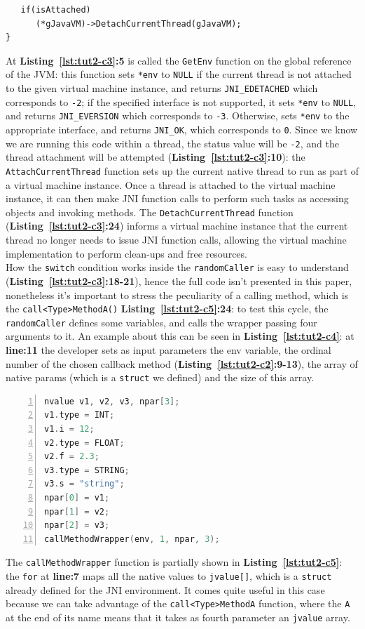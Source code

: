 \documentclass[a4paper,10pt]{article}
\newcommand{\keyword}[1]{\texttt{#1}}
\newcommand{\refl}[1]{\textbf{Listing~\ref{#1}}}
\begin{document}
\begin{multicols}{2}
\begin{lstlisting}
   if(isAttached)
      (*gJavaVM)->DetachCurrentThread(gJavaVM);
}
\end{lstlisting}
At \refl{lst:tut2-c3}\textbf{:5} is called the \keyword{GetEnv} function on the global reference of the JVM: this function sets \keyword{*env} to \keyword{NULL} if the current thread is not attached to the given virtual machine instance, and returns \keyword{JNI\_EDETACHED} which corresponds to \keyword{-2}; if the specified interface is not supported, it sets \keyword{*env} to \keyword{NULL}, and returns \keyword{JNI\_EVERSION} which corresponds to \keyword{-3}. Otherwise, sets \keyword{*env} to the appropriate interface, and returns \keyword{JNI\_OK}, which corresponds to \keyword{0}. Since we know we are running this code within a thread, the status value will be \keyword{-2}, and the thread attachment will be attempted (\refl{lst:tut2-c3}\textbf{:10}): the \keyword{AttachCurrentThread} function sets up the current native thread to run as part of a virtual machine instance. Once a thread is attached to the virtual machine instance, it can then make JNI function calls to perform such tasks as accessing objects and invoking methods. The \keyword{DetachCurrentThread} function (\refl{lst:tut2-c3}\textbf{:24}) informs a virtual machine instance that the current thread no longer needs to issue JNI function calls, allowing the virtual machine implementation to perform clean-ups and free resources.\\
How the \keyword{switch} condition works inside the \keyword{randomCaller} is easy to understand (\refl{lst:tut2-c3}\textbf{:18-21}), hence the full code isn't presented in this paper, nonetheless it's important to stress the peculiarity of a calling method, which is the \keyword{call<Type>MethodA()} \refl{lst:tut2-c5}\textbf{:24}: to test this cycle, the \keyword{randomCaller} defines some variables, and calls the wrapper passing four arguments to it. An example about this can be seen in \refl{lst:tut2-c4}: at \textbf{line:11} the developer sets as input parameters the env variable, the ordinal number of the chosen callback method (\refl{lst:tut2-c2}\textbf{:9-13}), the array of native params (which is a \keyword{struct} we defined) and the size of this array.
\begin{lstlisting}[language=C,
				   columns=fullflexible,
				   showstringspaces=false,
				   xleftmargin=15pt,
				   frame = l,
				   numbers=left,
				   commentstyle=\color{gray}\upshape,
				   caption=Part of tutorial2.c - method calls in randomCaller(),
				   label=lst:tut2-c4]
nvalue v1, v2, v3, npar[3];
v1.type = INT;
v1.i = 12;
v2.type = FLOAT;
v2.f = 2.3;
v3.type = STRING;
v3.s = "string";
npar[0] = v1;
npar[1] = v2;
npar[2] = v3;
callMethodWrapper(env, 1, npar, 3);
\end{lstlisting}
The \keyword{callMethodWrapper} function is partially shown in \refl{lst:tut2-c5}: the \keyword{for} at \textbf{line:7} maps all the native values to \keyword{jvalue[]}, which is a \keyword{struct} already defined for the JNI environment. It comes quite useful in this case because we can take advantage of the \keyword{call<Type>MethodA} function, where the \keyword{A} at the end of its name means that it takes as fourth parameter an \keyword{jvalue} array.


\end{multicols}
\end{document}
